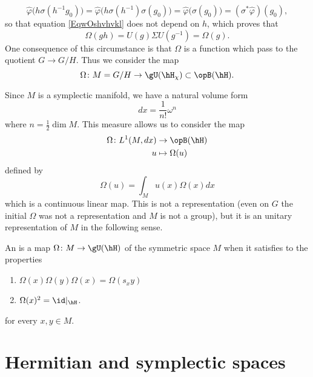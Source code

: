 \begin{equation}
	\hat\varphi\big( h\sigma(h^{-1}g_0) \big)=\hat\varphi\big( h\sigma(h^{-1})\sigma(g_0) \big)=\hat\varphi\big( \sigma(g_0) \big)=(\sigma^*\hat\varphi)(g_0),
\end{equation}
so that equation \eqref{EqwOshvhvkl} does not depend on $h$, which proves that
\begin{equation}
	\Omega(gh)=U(g)\Sigma U(g^{-1})=\Omega(g).
\end{equation}
One consequence of this circumstance is that $\Omega$ is a function which pass to the quotient $G\to G/H$. Thus we consider the map
\begin{equation}
	\Omega\colon M=G/H\to \gU(\hH_{\chi})\subset\opB(\hH).
\end{equation}

Since $M$ is a symplectic manifold, we have a natural volume form
\begin{equation}
	dx=\frac{1}{ n! }\omega^n
\end{equation}
where $n=\frac{ 1 }{2}\dim M$. This measure allows us to consider the map
\begin{equation}
	\begin{aligned}
		\Omega\colon L^1(M,dx) & \to \opB(\hH)     \\
		u                      & \mapsto \Omega(u)
	\end{aligned}
\end{equation}
defined by
\begin{equation}
	\Omega(u)=\int_M u(x)\Omega(x)dx
\end{equation}
which is a continuous linear map. This is not a representation (even on $G$ the initial $\Omega$ was not a representation and $M$ is not a group), but it is an unitary representation of $M$ in the following sense.

\begin{definition}
	An  is a map $\Omega\colon M\to \gU(\hH)$ of the symmetric space $M$ when it satisfies to the properties
	\begin{enumerate}
		\item
		      $\Omega(x)\Omega(y)\Omega(x)=\Omega(s_xy)$
		\item
		      $\Omega(x)^2=\id|_{\hH}$.

	\end{enumerate}
	for every $x,y\in M$.
\end{definition}
\section{Hermitian and symplectic spaces}
\label{SecHermEtSymplecticSpaces}

